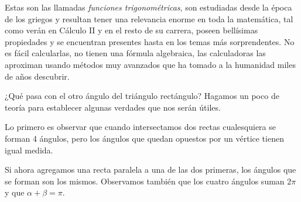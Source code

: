 Estas son las llamadas \emph{funciones trigonométricas}, son estudiadas desde la época de los griegos y resultan tener una relevancia enorme en toda la matemática, tal como verán en Cálculo II y en el resto de su carrera, poseen bellísimas propiedades y se encuentran presentes hasta en los temas más sorprendentes.
No es fácil calcularlas, no tienen una fórmula algebraica, las calculadoras las aproximan usando métodos muy avanzados que ha tomado a la humanidad miles de años descubrir.


¿Qué pasa con el otro ángulo del triángulo rectángulo? Hagamos un poco de teoría para establecer algunas verdades que nos serán útiles.

Lo primero es observar que cuando intersectamos dos rectas cualesquiera se forman 4 ángulos, pero los ángulos que quedan opuestos por un vértice tienen igual medida.

\begin{center}
\end{center}

Si ahora agregamos una recta paralela a una de las dos primeras, los ángulos que se forman son los mismos.
Observamos también que los cuatro ángulos suman $2\pi$ y que $\alpha+\beta =\pi$.

\begin{center}
\end{center}


